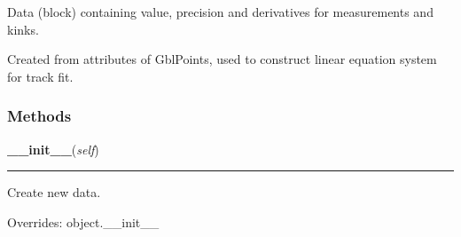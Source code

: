 Data (block) containing value, precision and derivatives for measurements 
and kinks.

Created from attributes of GblPoints, used to construct linear equation 
system for track fit.



  \subsubsection{Methods}

    \vspace{0.5ex}

\hspace{.8\funcindent}\begin{boxedminipage}{\funcwidth}

    \raggedright \textbf{\_\_init\_\_}(\textit{self})

    \vspace{-1.5ex}

    \rule{\textwidth}{0.5\fboxrule}
\setlength{\parskip}{2ex}
    Create new data.

\setlength{\parskip}{1ex}
      Overrides: object.\_\_init\_\_

    \end{boxedminipage}

    \label{gblfit:GblData:addDerivatives}

    \vspace{0.5ex}

